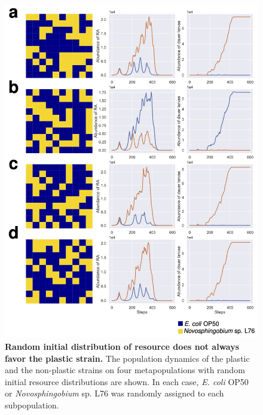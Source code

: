 \documentclass[10pt,letterpaper]{article}
\newcommand{\ecoli}{\emph{E. coli} OP50}
\newcommand{\novo}{\emph{Novosphingobium} sp. L76}
\begin{document}
\begin{figure}
\begin{adjustwidth}{-2in}{0in}
    \begin{flushright}
\includegraphics[width=140mm]{figures/figureS2.jpg}
\caption{\textbf{Random initial distribution of resource does not always favor the plastic strain.} The population dynamics of the plastic and the non-plastic strains on four metapopulations with random initial resource distributions are shown. In each case,  \ecoli{} or \novo{} was randomly assigned to each subpopulation.}
\label{fig:figs2}
\end{flushright}
\end{adjustwidth}
\end{figure}
\end{document}
